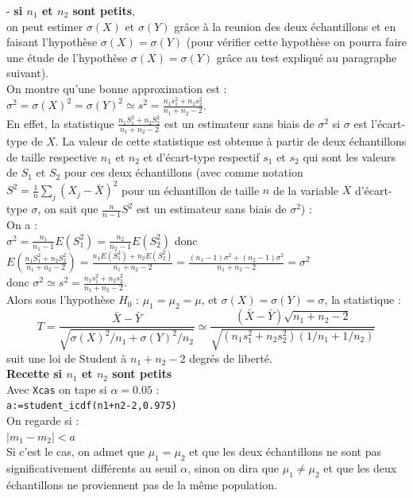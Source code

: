 \documentclass[a4paper,11pt]{book}
\begin{document}
- {\bf si $n_1$ et $n_2$ sont petits},\\
 on peut estimer $\sigma(X)$  et $\sigma(Y)$ 
gr\^ace \`a la reunion des deux \'echantillons et
en faisant l'hypoth\`ese $\sigma(X)=\sigma(Y)$ (pour v\'erifier cette 
hypoth\`ese on pourra faire une \'etude de l'hypoth\`ese $\sigma(X)=\sigma(Y)$
gr\^ace au test expliqu\'e au paragraphe suivant).\\
On montre qu'une bonne approximation est  :\\
$\displaystyle \sigma^2=\sigma(X)^2=\sigma(Y)^2 \simeq s^2=\frac{n_1s_1^2+n_2s_2^2}{n_1+n_2-2} $.\\
En effet, la statistique $\displaystyle \frac{n_1S_1^2+n_2S_2^2}{n_1+n_2-2}$ 
est un estimateur sans biais de $\sigma^2$ si $\sigma$ est l'\'ecart-type de 
$X$. 
La valeur de cette statistique est obtenue \`a partir  de 
deux \'echantillons de taille respective $n_1$ et $n_2$ et d'\'ecart-type 
respectif $s_1$ et $s_2$ qui sont les valeurs de $S_1$ et $S_2$ pour ces 
deux \'echantillons (avec comme notation 
$\displaystyle S^2=\frac{1}{n}\sum_j (X_j-\bar X)^2$ pour un \'echantillon de taille $n$ de 
la variable $X$ d'\'ecart-type $\sigma$, on sait que $\displaystyle \frac{n}{n-1}S^2$ est un 
estimateur sans biais de $\sigma^2$) :\\
On a :\\
$\displaystyle \sigma^2=\frac{n_1}{n_1-1}E(S_1^2)=\frac{n_2}{n_2-1}E(S_2^2)$ donc\\
$\displaystyle E(\frac{n_1S_1^2+n_2S_2^2}{n_1+n_2-2})=
\frac{n_1E(S_1^2)+n_2E(S_2^2)}{n_1+n_2-2}=
\frac{(n_1-1)\sigma^2+(n_2-1)\sigma^2}{n_1+n_2-2}=\sigma^2$\\
donc $\displaystyle \sigma^2 \simeq s^2=\frac{n_1s_1^2+n_2s_2^2}{n_1+n_2-2}$.\\
Alors sous l'hypoth\`ese $H_0$ : $\mu_1=\mu_2=\mu$, et
$\sigma(X)=\sigma(Y)=\sigma$, la statistique :\\
$$T=\frac{\bar X-\bar Y}{\sqrt{\sigma(X)^2/n_1+\sigma(Y)^2/n_2}}\simeq \frac{(\bar X-\bar Y)\sqrt{n_1+n_2-2}}{\sqrt{(n_1s_1^2+n_2s_2^2)(1/n_1+1/n_2)}}$$ suit 
 une loi de Student \`a $n_1+n_2-2$ degr\'es de libert\'e.\\
{\bf Recette si $n_1$ et $n_2$ sont petits}\\
Avec {\tt Xcas} on tape si $\alpha=0.05$ :\\
{\tt a:=student\_icdf(n1+n2-2,0.975)} \\
On regarde si :\\
 $\displaystyle |m_1-m_2|<a$\\
Si c'est le cas, on admet que  $\mu_1=\mu_2$ et que les deux \'echantillons ne 
sont pas significativement diff\'erents au seuil $\alpha$, sinon on dira que 
 $\mu_1 \neq \mu_2$ et que les deux \'echantillons ne proviennent pas de la 
m\^eme population.
\end{document}
